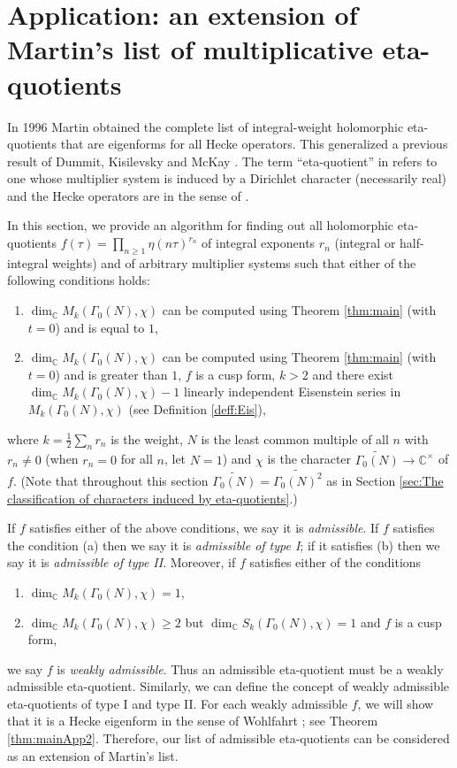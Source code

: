 \documentclass[12pt]{amsart}
\numberwithin{equation}{section}
\theoremstyle{plain}
\theoremstyle{definition}
\theoremstyle{remark}
\newcommand\numC{\mathbb{C}}
\newcommand\Dcover[2]{\widetilde{#1^{#2}}}
\begin{document}
\section{Application: an extension of Martin's list of multiplicative eta-quotients}
\label{sec:an extension of Martin's list of multiplicative eta-quotients}
In 1996 Martin \cite{Mar96} obtained the complete list of integral-weight holomorphic eta-quotients that are eigenforms for all Hecke operators. This generalized a previous result of Dummit, Kisilevsky and McKay \cite{DKM85}. The term ``eta-quotient'' in \cite{Mar96} refers to one whose multiplier system is induced by a Dirichlet character (necessarily real) and the Hecke operators are in the sense of \cite{AL70}.

In this section, we provide an algorithm for finding out all holomorphic eta-quotients $f(\tau)=\prod_{n\geq1}\eta(n\tau)^{r_n}$ of integral exponents $r_n$ (integral or half-integral weights) and of arbitrary multiplier systems such that either of the following conditions holds:
\begin{enumerate}
  \item $\dim_\numC M_k(\Gamma_0(N),\chi)$ can be computed using Theorem \ref{thm:main} (with $t=0$) and is equal to $1$,
  \item $\dim_\numC M_k(\Gamma_0(N),\chi)$ can be computed using Theorem \ref{thm:main} (with $t=0$) and is greater than $1$, $f$ is a cusp form, $k>2$ and there exist $\dim_\numC M_k(\Gamma_0(N),\chi)-1$ linearly independent Eisenstein series in $M_k(\Gamma_0(N),\chi)$ (see Definition \ref{deff:Eis}),
\end{enumerate}
where $k=\frac{1}{2}\sum_nr_n$ is the weight, $N$ is the least common multiple of all $n$ with $r_n\neq 0$ (when $r_n=0$ for all $n$, let $N=1$) and $\chi$ is the character $\widetilde{\Gamma_0(N)}\rightarrow\numC^\times$ of $f$. (Note that throughout this section $\widetilde{\Gamma_0(N)}=\Dcover{\Gamma_0(N)}{2}$ as in Section \ref{sec:The classification of characters induced by eta-quotients}.)

If $f$ satisfies either of the above conditions, we say it is \emph{admissible}. If $f$ satisfies the condition (a) then we say it is \emph{admissible of type I}; if it satisfies (b) then we say it is \emph{admissible of type II}. Moreover, if $f$ satisfies either of the conditions
\begin{enumerate}
  \item[(a')] $\dim_\numC M_k(\Gamma_0(N),\chi)=1$,
  \item[(b')] $\dim_\numC M_k(\Gamma_0(N),\chi)\geq2$ but $\dim_\numC S_k(\Gamma_0(N),\chi)=1$ and $f$ is a cusp form,
\end{enumerate}
we say $f$ is \emph{weakly admissible}. Thus an admissible eta-quotient must be a weakly admissible eta-quotient. Similarly, we can define the concept of weakly admissible eta-quotients of type I and type II. For each weakly admissible $f$, we will show that it is a Hecke eigenform in the sense of Wohlfahrt \cite{Woh57}; see Theorem \ref{thm:mainApp2}. Therefore, our list of admissible eta-quotients can be considered as an extension of Martin's list.
\end{document}
